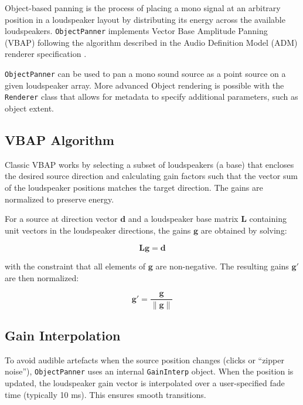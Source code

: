 \documentclass[12pt]{report}
\newcommand{\code}[1]{\texttt{#1}}
\begin{document}
Object-based panning is the process of placing a mono signal at an arbitrary position in a loudspeaker layout by distributing its energy across the available loudspeakers.  
\texttt{ObjectPanner} implements Vector Base Amplitude Panning (VBAP) following the algorithm described in the Audio Definition Model (ADM) renderer specification \cite{Pulkki1997, ITU2127}.

\texttt{ObjectPanner} can be used to pan a mono sound source as a point source on a given loudspeaker array.
More advanced Object rendering is possible with the \texttt{Renderer} class that allows for metadata to specify additional parameters, such as object extent.

\subsection{VBAP Algorithm}

Classic VBAP works by selecting a subset of loudspeakers (a base) that encloses the desired source direction and calculating gain factors such that the vector sum of the loudspeaker positions matches the target direction. The gains are normalized to preserve energy.

For a source at direction vector $\mathbf{d}$ and a loudspeaker base matrix $\mathbf{L}$ containing unit vectors in the loudspeaker directions, the gains $\mathbf{g}$ are obtained by solving:

\begin{equation}
\mathbf{L} \mathbf{g} = \mathbf{d}
\end{equation}

with the constraint that all elements of $\mathbf{g}$ are non-negative. The resulting gains $\mathbf{g}'$ are then normalized:

\begin{equation}
\mathbf{g}' = \frac{\mathbf{g}}{\|\mathbf{g}\|}
\end{equation}

\subsection{Gain Interpolation}

To avoid audible artefacts when the source position changes (clicks or ``zipper noise''), \code{ObjectPanner} uses an internal \code{GainInterp} object. When the position is updated, the loudspeaker gain vector is interpolated over a user-specified fade time (typically 10 ms). This ensures smooth transitions.
\end{document}
